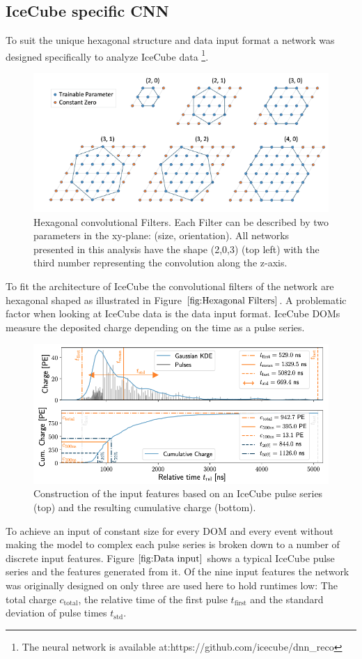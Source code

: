 \documentclass[
  tucolor,       %
  BCOR=12mm,     %
  parskip=half,  %
  open=any,      %
  cleardoublepage=plain,  %
]{tudothesis}
\begin{document}
\subsection{IceCube specific CNN}
To suit the unique hexagonal structure and data input format a network was designed specifically to analyze IceCube data \footnote{The neural network is available at:https://github.com/icecube/dnn\_reco}.
\begin{figure}
  \centering
  \includegraphics[scale=0.6]{Plots/Hexagonal Filters}
  \caption{Hexagonal convolutional Filters. Each Filter can be described by two parameters in the xy-plane: (size, orientation). All networks presented in this analysis have the shape (2,0,3) (top left) with the third number representing the convolution along the z-axis. \cite{Abbasi_2021}}
  \label{fig:Hexagonal Filters}
\end{figure}
To fit the architecture of IceCube the convolutional filters of the network are hexagonal shaped as illustrated in Figure $\ref{fig:Hexagonal Filters}$.
A problematic factor when looking at IceCube data is the data input format. IceCube DOMs measure the deposited charge depending on the time as a pulse series.
\begin{figure}
  \centering
  \includegraphics[scale=0.5]{Plots/Data input}
  \caption{Construction of the input features based on an IceCube pulse series (top) and the resulting cumulative charge (bottom). \cite{Abbasi_2021}}
  \label{fig:Data input}
\end{figure}
To achieve an input of constant size for every DOM and every event without making the model to complex each pulse series is broken down to a number of discrete input features. Figure $\ref{fig:Data input}$ shows a typical IceCube pulse series and the features generated from it. Of the nine input features the network was originally designed on only three are used here to hold runtimes low: The total charge $c_{\mathrm{total}}$, the relative time of the first pulse $t_{\mathrm{first}}$ and the standard deviation of pulse times $t_{\mathrm{std}}$.
\end{document}
